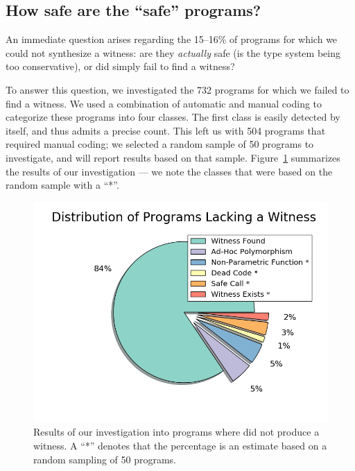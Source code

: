 \subsection{How safe are the ``safe'' programs?}
\label{sec:how-safe}

An immediate question arises regarding the 15--16\% of programs for
which we could not synthesize a witness:
%
are they \emph{actually} safe (\ie is the type system being too conservative),
%
or did \toolname simply fail to find a witness?
%

To answer this question, we investigated the 732 \ucsdbench programs for
which we failed to find a witness.
%
We used a combination of automatic and manual coding to categorize these
programs into four classes.
%
The first class is easily detected by \toolname itself, and thus admits
a precise count.
%
This left us with 504 programs that required manual coding; we selected
a random sample of 50 programs to investigate, and will report results
based on that sample.
%
Figure~\ref{fig:no-witness} summarizes the results of our investigation ---
we note the classes that were based on the random sample with a ``*''.


\begin{figure}[t]
\includegraphics[width=0.7\linewidth]{distrib_ext.png}
\vspace{-0.75cm}
\caption{Results of our investigation into programs where \toolname
  did not produce a witness. A ``*'' denotes that the percentage is an
  estimate based on a random sampling of 50 programs.}
\label{fig:no-witness}
\end{figure}

